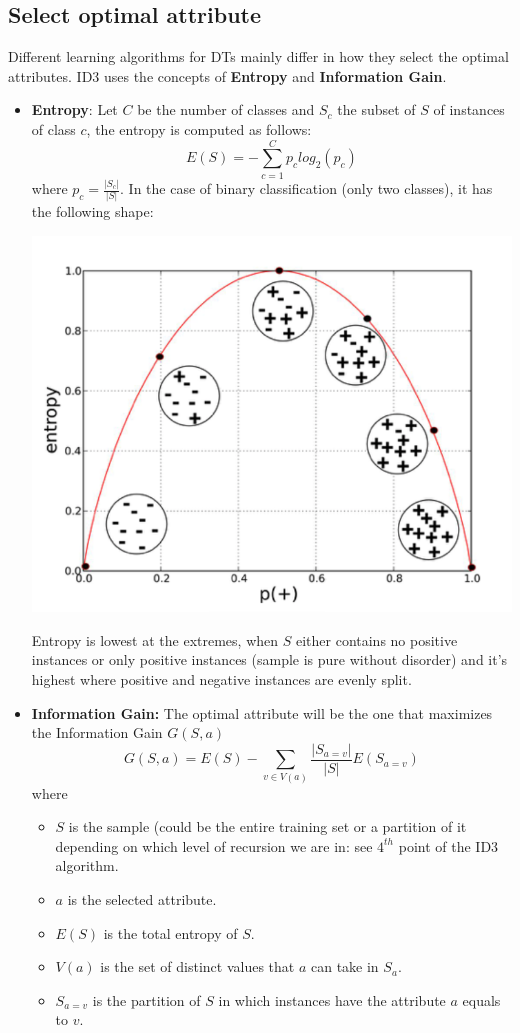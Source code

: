 \subsection{Select optimal attribute}
Different learning algorithms for DTs mainly differ in how they select the optimal attributes. ID3 uses the concepts of \textbf{Entropy} and \textbf{Information Gain}.
\begin{itemize}
    \item \textbf{Entropy}: Let $C$ be the number of classes and $S_{c}$ the subset of $S$ of instances of class $c$, the entropy is computed as follows:
    \[E(S) = -\sum_{c=1}^{C}p_{c}log_{2}(p_{c})\]
    where $p_{c} = \frac{|S_{c}|}{|S|}$.
    In the case of binary classification (only two classes), it has the following shape:
    \begin{center}
        \includegraphics[scale=0.5]{images/entropy.png}
    \end{center}
    Entropy is lowest at the extremes, when $S$ either contains no positive instances or only positive instances (sample is pure without disorder) and it's highest where positive and negative instances are evenly split.
    
    \item \textbf{Information Gain:} The optimal attribute will be the one that maximizes the Information Gain $G(S,a)$
    \[G(S,a) = E(S) - \sum_{v \in V(a)}\frac{|S_{a=v}|}{|S|}E(S_{a=v})\]
    where 
    \begin{itemize}
        \item $S$ is the sample (could be the entire training set or a partition of it depending on which level of recursion we are in: see $4^{th}$ point of the ID3 algorithm.
        \item $a$ is the selected attribute.
        \item $E(S)$ is the total entropy of $S$.
        \item $V(a)$ is the set of distinct values that $a$ can take in $S_{a}$.
        \item $S_{a=v}$ is the partition of $S$ in which instances have the attribute $a$ equals to $v$.
    \end{itemize}
\end{itemize}
